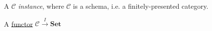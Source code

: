 A $\mathcal{C}$ \emph{instance}, where $\mathcal{C}$ is a schema, i.e. a finitely-presented category.

A \href{doc/1 math/Seven Sketches in Compositionality/Chapter 3: Databases/3 Functors, natural transformations, and databases/2 Functors/1 Functor}{functor} $\mathcal{C} \xrightarrow{I} \mathbf{Set}$

